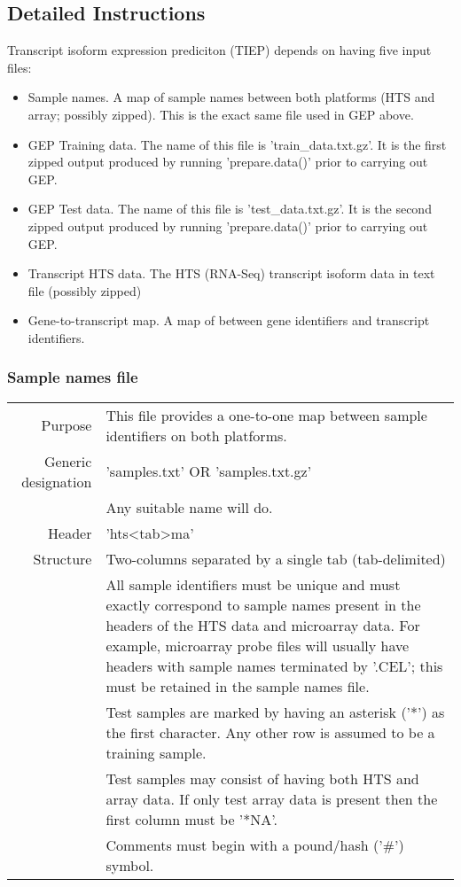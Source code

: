 \documentclass[a4paper,12pt]{article}
\begin{document}
\subsection{Detailed Instructions}
Transcript isoform expression prediciton (TIEP) depends on having five input files:
\begin{itemize}
\item Sample names. A map of sample names between both platforms (HTS and array; possibly zipped). This is the exact same file used in GEP above.
\item GEP Training data. The name of this file is 'train\_data.txt.gz'. It is the first zipped output produced by running 'prepare.data()' prior to carrying out GEP.
\item GEP Test data. The name of this file is 'test\_data.txt.gz'. It is the second zipped output produced by running 'prepare.data()' prior to carrying out GEP.
\item Transcript HTS data. The HTS (RNA-Seq) transcript isoform data in text file (possibly zipped)
\item Gene-to-transcript map. A map of between gene identifiers and transcript identifiers. 
\end{itemize}

\subsubsection{Sample names file}

\begin{tabular}{rp{12cm}}
Purpose & This file provides a one-to-one map between sample identifiers on both platforms. \\
Generic designation & 'samples.txt' OR 'samples.txt.gz' \\
   & Any suitable name will do. \\
Header & 'hts\textless tab\textgreater ma' \\
Structure & Two-columns separated by a single tab (tab-delimited) \\
  & All sample identifiers must be unique and must exactly correspond to sample names present in the headers of the HTS data and microarray data. For example, microarray probe files will usually have headers with sample names terminated by '.CEL'; this must be retained in the sample names file. \\
  & Test samples are marked by having an asterisk ('*') as the first character. Any other row is assumed to be a training sample. \\
  & Test samples may consist of having both HTS and array data. If only test array data is present then the first column must be '*NA'. \\
  & Comments must begin with a pound/hash ('\#') symbol. \\
\end{tabular}
\end{document}
